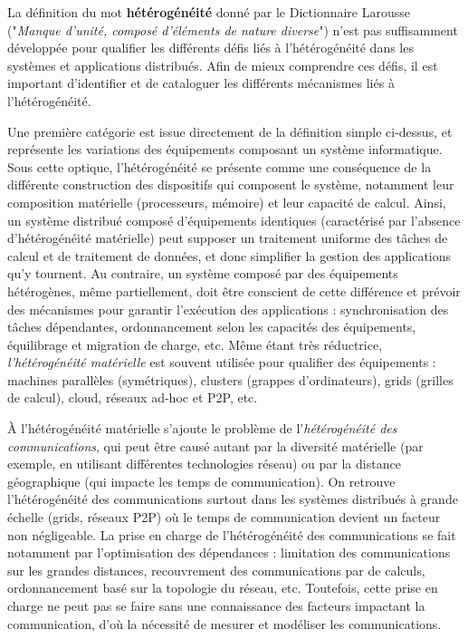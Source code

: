 
La définition du mot \textbf{hétérogénéité} donné par le Dictionnaire Larousse ("\textit{Manque d'unité, composé d'éléments de nature diverse}") n'est pas suffisamment développée pour qualifier les différents défis liés à l'hétérogénéité dans les systèmes et applications distribués. Afin de mieux comprendre ces défis, il est important d'identifier et de cataloguer les différents mécanismes liés à l'hétérogénéité.

Une première catégorie est issue directement de la définition simple ci-dessus, et représente les variations des équipements composant un système informatique. Sous cette optique, l'hétérogénéité se présente comme une conséquence de la différente construction des dispositifs qui composent le système, notamment leur composition matérielle (processeurs, mémoire) et leur capacité de calcul. Ainsi, un système distribué composé d'équipements identiques (caractérisé par l'absence d'hétérogénéité matérielle) peut supposer un traitement uniforme des tâches de calcul et de traitement de données, et donc simplifier la gestion des applications qu'y tournent. Au contraire, un système composé par des équipements hétérogènes, même partiellement, doit être conscient de cette différence et prévoir des mécanismes pour garantir l'exécution des applications : synchronisation des tâches dépendantes, ordonnancement selon les capacités des équipements, équilibrage et migration de charge, etc.  Même étant très réductrice, \textit{l'hétérogénéité matérielle} est souvent utilisée pour qualifier des équipements : machines parallèles (symétriques), clusters (grappes d'ordinateurs), grids (grilles de calcul), cloud, réseaux ad-hoc et P2P, etc.

À l'hétérogénéité matérielle s'ajoute le problème de l'\textit{hétérogénéité des communications}, qui peut être causé autant par la diversité matérielle (par exemple, en utilisant différentes technologies réseau) ou par la distance géographique (qui impacte les temps de communication). On retrouve l'hétérogénéité des communications surtout dans les systèmes distribués à grande échelle (grids, réseaux P2P) où le temps de communication devient un facteur non négligeable. La prise en charge de l'hétérogénéité des communications se fait notamment par l'optimisation des dépendances : limitation des communications sur les grandes distances,  recouvrement des communications par de calculs, ordonnancement basé sur la topologie du réseau, etc. Toutefois, cette prise en charge ne peut pas se faire sans une connaissance des facteurs impactant la communication, d'où la nécessité de mesurer et modéliser les communications. 

